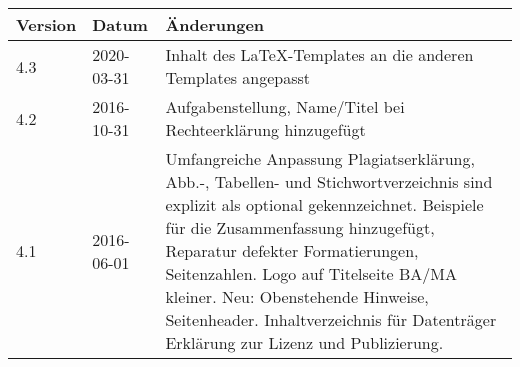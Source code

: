 {\renewcommand{\arraystretch}{1.5}
\begin{table}[h!]
\centering
\begin{tabular}{ |p{1.5cm}|p{2cm}|p{10cm}| } 
\hline
    \textbf{Version} & \textbf{Datum} & \textbf{Änderungen} \\
\hline
4.3 & 2020-03-31 & Inhalt des \LaTeX-Templates an die anderen Templates angepasst \\
\hline
4.2 & 2016-10-31 & Aufgabenstellung, Name/Titel bei Rechteerklärung hinzugefügt \\
\hline
4.1 & 2016-06-01 & Umfangreiche Anpassung Plagiatserklärung, Abb.-, Tabellen- und Stichwortverzeichnis sind explizit als optional gekennzeichnet. Beispiele für die Zusammenfassung hinzugefügt, Reparatur defekter Formatierungen, Seitenzahlen. Logo auf Titelseite BA/MA kleiner.
Neu: Obenstehende Hinweise, Seitenheader. Inhaltverzeichnis für Datenträger Erklärung zur Lizenz und Publizierung. \\
\hline
\end{tabular}
\end{table}}

\newpage
